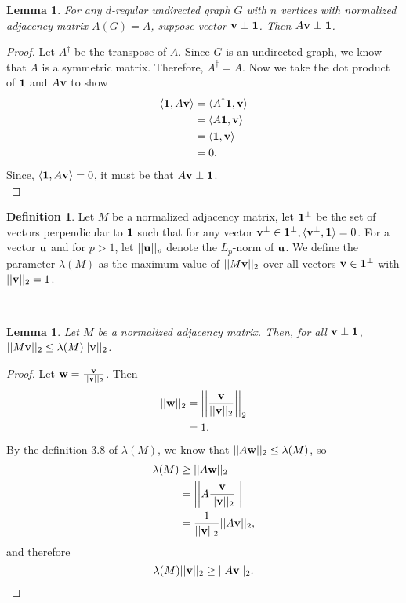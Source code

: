 \documentclass[psamsfonts, 10pt]{amsart}
\newtheorem{lem}[thm]{Lemma}
\theoremstyle{definition}
\newtheorem{defn}[thm]{Definition}
\theoremstyle{remark}
\numberwithin{equation}{section}
\newcommand{\creturn}{\mbox{}\\}
\begin{document}
\begin{lem}
For any $d$-regular undirected graph $G$ with $n$ vertices with normalized adjacency matrix $A(G) = A$, suppose vector ${\bf v} \perp {\bf 1}$. Then $A{\bf v} \perp {\bf 1}$.
\end{lem}
\begin{proof}
Let $A^\dagger$ be the transpose of $A$. Since $G$ is an undirected graph, we know that $A$ is a symmetric matrix. Therefore, $A^\dagger = A$. Now we take the dot product of ${\bf 1}$ and $A{\bf v}$ to show
\[
\begin{aligned}
\langle {\bf 1}, A{\bf v} \rangle &= \langle A^\dagger {\bf 1},{\bf v} \rangle\\
&= \langle A{\bf 1},{\bf v} \rangle\\
&= \langle {\bf 1},{\bf v} \rangle\\
&= 0.
\end{aligned}
\]
Since, $\langle {\bf 1}, A{\bf v} \rangle = 0$, it must be that $A{\bf v} \perp {\bf 1}$.
\\
\end{proof}

\begin{defn}
Let  $M$ be a normalized adjacency matrix, let ${\bf 1}^\perp$ be the set of vectors perpendicular to ${\bf 1}$ such that for any vector ${\bf v}^\perp \in {\bf 1}^\perp, \langle {\bf v}^\perp, {\bf 1} \rangle = 0$. For a vector ${\bf u}$ and for $p > 1$, let $\lvert \lvert {\bf u} \rvert \rvert_p$ denote the $L_p$-norm of ${\bf u}$. We define the parameter $\lambda(M)$ as the maximum value of $\lvert\lvert M{\bf v} \rvert\rvert_2$ over all vectors ${\bf v} \in {\bf 1}^\perp$ with $\lvert \lvert {\bf v} \rvert \rvert_2 = 1$.
\end{defn}\creturn

\begin{lem}
Let  $M$ be a normalized adjacency matrix. Then, for all ${\bf v} \perp {\bf 1}$, $\lvert \lvert M{\bf v} \rvert \rvert_2 \leq \lambda(M)\lvert\lvert {\bf v} \rvert\rvert_2$.
\end{lem}
\begin{proof}
Let ${\bf w} = \frac{{\bf v}}{\lvert \lvert {\bf v} \rvert \rvert _2}$. Then
\[
\begin{aligned}
\lvert \lvert {\bf w} \rvert \rvert_2 &= \left| \left| \frac{\bf{v}}{\lvert\lvert {\bf v} \rvert \rvert _2}\right| \right| _2\\
&= 1.
\end{aligned}
\]
By the definition 3.8 of $\lambda(M)$, we know that $\lvert \lvert A{\bf w} \rvert \rvert_2 \leq \lambda(M)$, so
\[
\begin{aligned}
\lambda(M) &\geq \lvert \lvert A{\bf w} \rvert \rvert_2\\
&= \left| \left| A \frac{{\bf v}}{\lvert \lvert {\bf v} \rvert \rvert _2} \right| \right| \\
&= \frac{1}{\lvert \lvert {\bf v} \rvert \rvert_2}\lvert \lvert A {\bf v} \rvert \rvert_2,
\end{aligned}
\]
and therefore
\[
 \lambda(M)\lvert\vert {\bf v} \rvert \rvert_2 \geq \lvert \lvert A {\bf v} \rvert \rvert_2.
\]
\end{proof}
\end{document}
